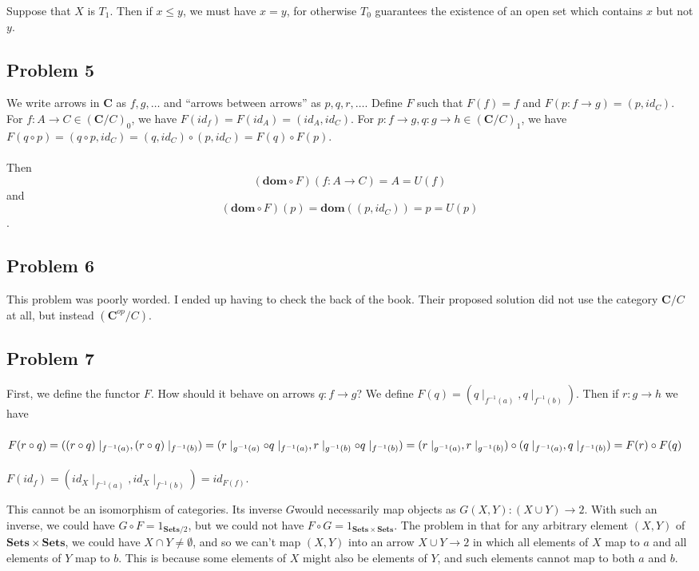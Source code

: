 \documentclass{article}
\newcommand{\mbf}{\mathbf}
\begin{document}
Suppose that $X$ is $T_1$. Then if $x \leq y$, we must have $x = y$, for 
otherwise $T_0$ guarantees the existence of an open set which contains $x$ but not $y$.

\subsection{Problem 5}

We write arrows in $\mbf{C}$ as $f,g,\ldots$ and ``arrows between arrows'' as $p,q,r,\ldots$.
Define $F$ such that $F(f) = f$ and $F(p : f \to g) = (p, id_C)$.
For $f : A \to C \in (\mbf{C}/C)_0$, we have $F(id_f) = F(id_A) = (id_A, id_C)$.
For $p : f \to g, q : g \to h \in (\mbf{C}/C)_1$, we have $F(q \circ p) = 
(q \circ p, id_C) = (q, id_C) \circ (p, id_C) = F(q) \circ F(p)$.\\~\\
Then $$(\mbf{dom} \circ F)(f : A \to C) = A = U(f)$$ and
$$(\mbf{dom} \circ F)(p) = \mbf{dom}( (p,id_C) ) = p = U(p)$$.

\subsection{Problem 6}

This problem was poorly worded. I ended up having to check the back of the book.
Their proposed solution did not use the category $\mbf{C}/C$ at all,
but instead $(\mbf{C}^{op}/C)$. 

\subsection{Problem 7}

First, we define the functor $F$. 
How should it behave on arrows $q : f \to g$?
We define $F(q) = (q \mid_{f^{-1}(a)}, q \mid_{f^{-1}(b)})$.
Then if $r : g \to h$ we have\\~\\
$F(r \circ q) = ((r \circ q)\mid_{f^{-1}(a)}, (r \circ q) \mid_{f^{-1}(b)})\\
= (r \mid_{g^{-1}(a)} \circ q \mid_{f^{-1}(a)}, r \mid_{g^{-1}(b)} \circ q \mid_{f^{-1}(b)})\\
= (r \mid_{g^{-1}(a)},r \mid_{g^{-1}(b)}) \circ (q \mid_{f^{-1}(a)}, q \mid_{f^{-1}(b)})\\
= F(r) \circ F(q)$\\~\\
$F(id_f) = (id_X \mid_{f^{-1}(a)}, id_X \mid_{f^{-1}(b)}) = id_{F(f)}$. 

This cannot be an isomorphism of categories. Its inverse $G$would necessarily map objects
as $G(X,Y) : (X \cup Y) \to 2$. With such an inverse, we could have $G \circ F = 1_{\mbf{Sets}/2}$,
but we could not have $F \circ G = 1_{\mbf{Sets} \times \mbf{Sets}}$. The problem in that for any arbitrary
element $(X,Y)$ of $\mbf{Sets} \times \mbf{Sets}$, we could have $X \cap Y \neq \emptyset$,
and so we can't map $(X,Y)$ into an arrow $X \cup Y \to 2$ in which all elements of $X$ map
to $a$ and all elements of $Y$ map to $b$. This is because some elements of $X$ might also be elements
of $Y$, and such elements cannot map to both $a$ and $b$.
\end{document}
